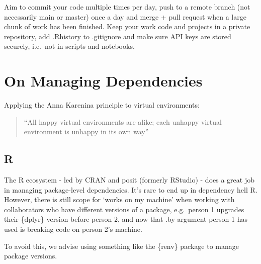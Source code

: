\documentclass[
  letterpaper,
  DIV=11,
  numbers=noendperiod]{scrreprt}
\begin{document}
Aim to commit your code multiple times per day, push to a remote branch
(not necessarily main or master) once a day and merge + pull request
when a large chunk of work has been finished. Keep your work code and
projects in a private repository, add .Rhistory to .gitignore and make
sure API keys are stored securely, i.e.~not in scripts and notebooks.

\section{On Managing Dependencies}\label{on-managing-dependencies}

Applying the Anna Karenina principle to virtual environments:

\begin{quote}
``All happy virtual environments are alike; each unhappy virtual
environment is unhappy in its own way''
\end{quote}

\subsection{R}\label{r-1}

The R ecosystem - led by CRAN and posit (formerly RStudio) - does a
great job in managing package-level dependencies. It's rare to end up in
dependency hell R. However, there is still scope for `works on my
machine' when working with collaborators who have different versions of
a package, e.g.~person 1 upgrades their \{dplyr\} version before person
2, and now that .by argument person 1 has used is breaking code on
person 2's machine.

To avoid this, we advise using something like the \{renv\} package to
manage package versions.
\end{document}

